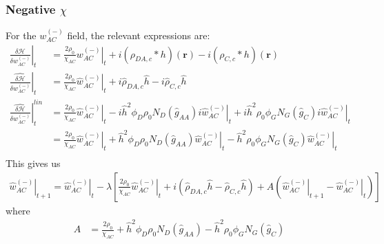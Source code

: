 \documentclass{article}
\begin{document}
    \subsubsection{Negative $\chi$}
  For the $w_{AC}^{(-)}$ field, the relevant expressions are:
  \begin{align*}
    \left. \frac{\delta \mathcal{H}}{\delta w_{AC}^{(-)}} \right|_t &=
      \frac{2 \rho_0}{\chi_{AC}} \left. w_{AC}^{(-)} \right|_t
      +i (\rho_{DA,c} \ast h)(\mathbf{r})
      -i (\rho_{C,c} \ast h)(\mathbf{r}) \\
    \left. \hat{\frac{\delta \mathcal{H}}{\delta w_{AC}^{(-)}}} \right|_t &=
      \frac{2 \rho_0}{\chi_{AC}} \left. \hat{w}_{AC}^{(-)} \right|_t
      +i \hat{\rho}_{DA,c} \hat{h}
      -i \hat{\rho}_{C,c} \hat{h} \\
    \left.
      \hat{\frac{\delta \mathcal{H}}{\delta w_{AC}^{(-)}}}
    \right| ^{lin}_t &=
    \frac{2\rho_0}{\chi_{AC}} \left. \hat{w}_{AC}^{(-)} \right|_t
      - i \hat{h}^2 \phi_D \rho_0 N_D
        (\hat{g}_{AA}) i \left.
          \hat{w}_{AC}^{(-)} \right|_t 
          + i \hat{h} ^2  {\rho}_0  
          \left. \phi_G N_G (\hat{g}_{C}) i \hat{w}_{AC}^{(-)} \right|_t
          \\
    &= \frac{2\rho_0}{\chi_{AC}} \left. \hat{w}_{AC}^{(-)} \right|_t
      + \hat{h}^2 \phi_D \rho_0 N_D
        (\hat{g}_{AA})
          \left. \hat{w}_{AC}^{(-)} \right|_t
          -  \hat{h} ^2  {\rho}_0  
          \left. \phi_G N_G (\hat{g}_{C})  \hat{w}_{AC}^{(-)} \right|_t
          \\
  \end{align*}
  This gives us
  \begin{align*}
    \left. \hat{w}_{AC}^{(-)} \right|_{t+1} =
      \left. \hat{w}_{AC}^{(-)} \right|_t - \lambda \left[
        \frac{2\rho_0}{\chi_{AC}} \left. \hat{w}_{AC}^{(-)} \right|_t
        + i ( \hat{\rho}_{DA,c} \hat{h}
              - \hat{\rho}_{C,c} \hat{h} )
        + A ( \left. \hat{w}_{AC}^{(-)} \right|_{t+1}
              - \left. \hat{w}_{AC}^{(-)} \right|_t)
      \right]
  \end{align*}
  where
  \begin{align*}
    A &=
    \frac{2\rho_0}{\chi_{AC}} 
      + \hat{h}^2 \phi_D \rho_0 N_D
        (\hat{g}_{AA})
        -  \hat{h} ^2  {\rho}_0  
          \phi_G N_G (\hat{g}_{C}) 
  \end{align*}
\end{document}
